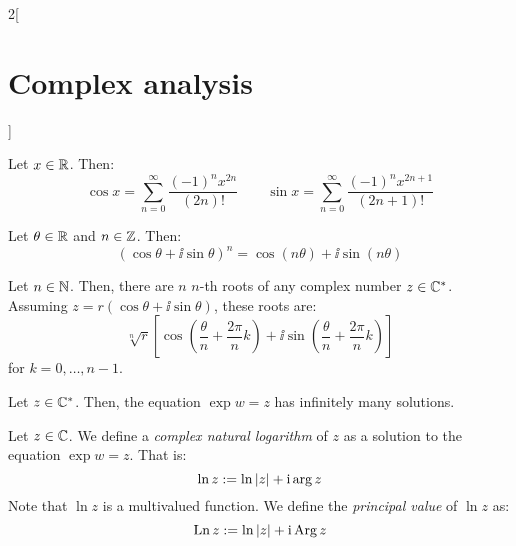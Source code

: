 \documentclass[../../../main.tex]{subfiles}
\begin{document}
\begin{multicols}{2}[\section{Complex analysis}]
\begin{corollary}
  \end{corollary}
  \begin{corollary}
    Let $x\in\mathbb{R}$. Then: $$\cos x=\sum_{n=0}^\infty\frac{(-1)^nx^{2n}}{(2n)!}\qquad\sin x=\sum_{n=0}^\infty\frac{(-1)^nx^{2n+1}}{(2n+1)!}$$
  \end{corollary}
  \begin{proposition}
    Let $\theta\in\mathbb{R}$ and $n\in\mathbb{Z}$. Then: $${(\cos{\theta} + \ii\sin{\theta})}^n = \cos(n\theta) + \ii\sin(n\theta)$$
  \end{proposition}
  \begin{theorem}
    Let $n\in\mathbb{N}$. Then, there are $n$ $n$-th roots of any complex number $z\in \mathbb{C}^*$. Assuming $z=r(\cos\theta + \ii\sin\theta)$, these roots are: $$\sqrt[n]{r}\left[\cos\left(\frac{\theta}{n}+\frac{2\pi}{n}k\right)+\ii\sin\left(\frac{\theta}{n}+\frac{2\pi}{n}k\right)\right]$$ for $k=0,\ldots,n-1$.
  \end{theorem}
  \begin{proposition}
    Let $z\in\mathbb{C}^*$. Then, the equation $\exp{w}=z$ has infinitely many solutions.
  \end{proposition}
  \begin{definition}
    Let $z\in \mathbb{C}$. We define a \emph{complex natural logarithm} of $z$ as a solution to the equation $\exp{w}=z$. That is: $$\ln z:=\ln \abs{z}+\mathrm{i}\arg z$$ Note that $\ln z$ is a multivalued function.
    We define the \emph{principal value} of $\ln z$ as: $$\operatorname{Ln} z:=\ln \abs{z}+\mathrm{i}\operatorname{Arg} z$$
  \end{definition}

\end{multicols}
\end{document}
